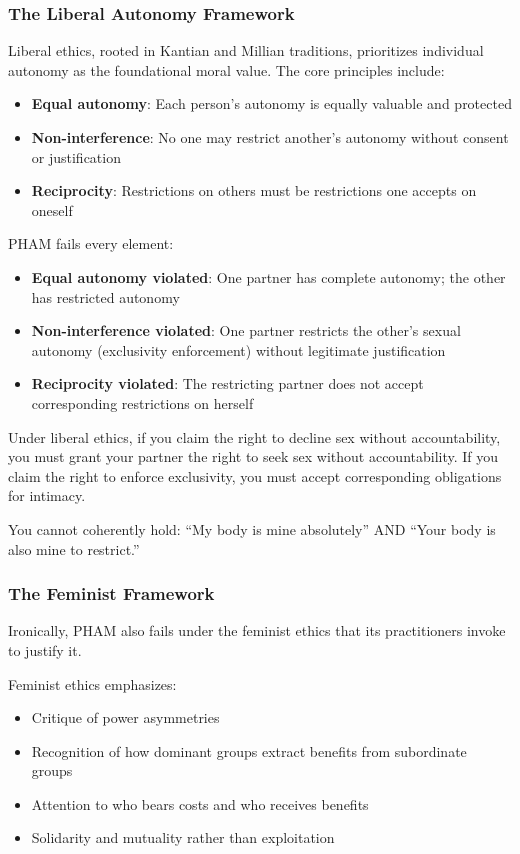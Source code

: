 \documentclass[12pt, letterpaper]{article}
\begin{document}
\subsubsection{The Liberal Autonomy Framework}

Liberal ethics, rooted in Kantian and Millian traditions, prioritizes individual autonomy as the foundational moral value. The core principles include:

\begin{itemize}
    \item \textbf{Equal autonomy}: Each person's autonomy is equally valuable and protected
    \item \textbf{Non-interference}: No one may restrict another's autonomy without consent or justification
    \item \textbf{Reciprocity}: Restrictions on others must be restrictions one accepts on oneself
\end{itemize}

PHAM fails every element:

\begin{itemize}
    \item \textbf{Equal autonomy violated}: One partner has complete autonomy; the other has restricted autonomy
    \item \textbf{Non-interference violated}: One partner restricts the other's sexual autonomy (exclusivity enforcement) without legitimate justification
    \item \textbf{Reciprocity violated}: The restricting partner does not accept corresponding restrictions on herself
\end{itemize}

Under liberal ethics, if you claim the right to decline sex without accountability, you must grant your partner the right to seek sex without accountability. If you claim the right to enforce exclusivity, you must accept corresponding obligations for intimacy.

You cannot coherently hold: ``My body is mine absolutely'' AND ``Your body is also mine to restrict.''

\subsubsection{The Feminist Framework}

Ironically, PHAM also fails under the feminist ethics that its practitioners invoke to justify it.

Feminist ethics emphasizes:
\begin{itemize}
    \item Critique of power asymmetries
    \item Recognition of how dominant groups extract benefits from subordinate groups
    \item Attention to who bears costs and who receives benefits
    \item Solidarity and mutuality rather than exploitation
\end{itemize}
\end{document}
